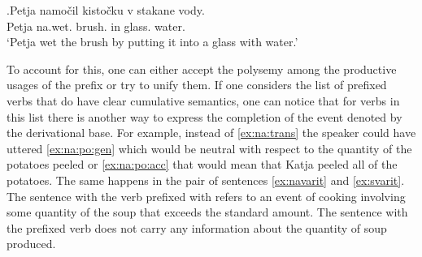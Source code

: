 \exg.\label{ex:namochit}Petja namo\v{c}il kisto\v{c}ku v stakane vody.\\
Petja na.wet. brush. in glass. water.\\
\trans `Petja wet the brush by putting it into a glass with water.'

%
%

To account for this, one can either accept the polysemy among the productive usages of the prefix  or try to unify them. If one considers the list of prefixed verbs that do have clear cumulative semantics, one can notice that for verbs in this list there is another way to express the completion of the event denoted by the derivational base. For example, instead of \ref{ex:na:trans} the speaker could have uttered \ref{ex:na:po:gen} which would be neutral with respect to the quantity of the potatoes peeled or \ref{ex:na:po:acc} that would mean that Katja peeled all of the potatoes. The same happens in the pair of sentences \ref{ex:navarit} and \ref{ex:svarit}. The sentence with the verb prefixed with  refers to an event of cooking involving some quantity of the soup that exceeds the standard amount. The sentence with the prefixed verb does not carry any information about the quantity of soup produced.

